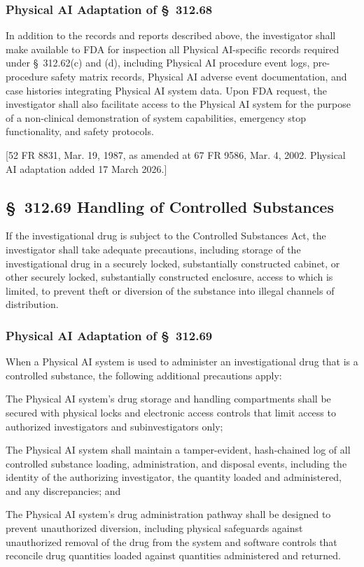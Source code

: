 \documentclass[11pt]{article}
\begin{document}
\subsubsection{Physical AI Adaptation of \S~312.68}

In addition to the records and reports described above, the investigator shall make available to FDA for inspection all Physical AI-specific records required under \S~312.62(c) and (d), including Physical AI procedure event logs, pre-procedure safety matrix records, Physical AI adverse event documentation, and case histories integrating Physical AI system data. Upon FDA request, the investigator shall also facilitate access to the Physical AI system for the purpose of a non-clinical demonstration of system capabilities, emergency stop functionality, and safety protocols.

[52 FR 8831, Mar. 19, 1987, as amended at 67 FR 9586, Mar. 4, 2002. Physical AI adaptation added 17 March 2026.]

\subsection{\S~312.69 Handling of Controlled Substances}

If the investigational drug is subject to the Controlled Substances Act, the investigator shall take adequate precautions, including storage of the investigational drug in a securely locked, substantially constructed cabinet, or other securely locked, substantially constructed enclosure, access to which is limited, to prevent theft or diversion of the substance into illegal channels of distribution.

\subsubsection{Physical AI Adaptation of \S~312.69}

When a Physical AI system is used to administer an investigational drug that is a controlled substance, the following additional precautions apply:

\begin{description}[leftmargin=0.8cm,style=sameline]
\item[(a)] The Physical AI system's drug storage and handling compartments shall be secured with physical locks and electronic access controls that limit access to authorized investigators and subinvestigators only;
\item[(b)] The Physical AI system shall maintain a tamper-evident, hash-chained log of all controlled substance loading, administration, and disposal events, including the identity of the authorizing investigator, the quantity loaded and administered, and any discrepancies; and
\item[(c)] The Physical AI system's drug administration pathway shall be designed to prevent unauthorized diversion, including physical safeguards against unauthorized removal of the drug from the system and software controls that reconcile drug quantities loaded against quantities administered and returned.
\end{description}
\end{document}
